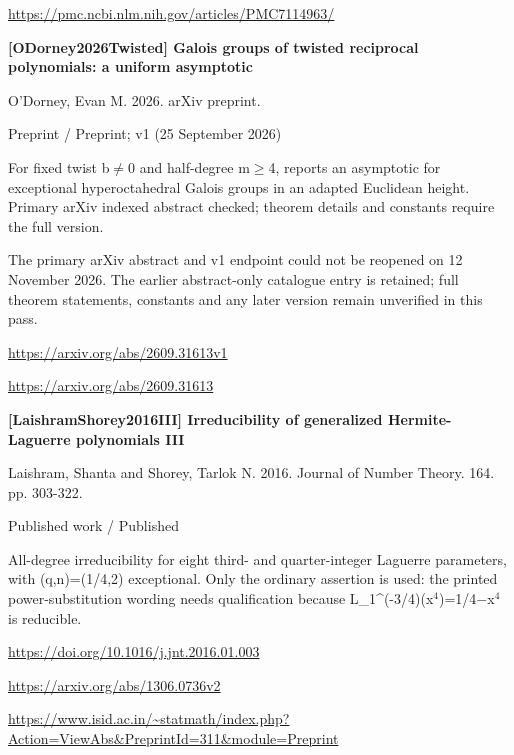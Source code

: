 \documentclass[11pt,a4paper,oneside,openany]{book}
\begin{document}
{\footnotesize\url{https://pmc.ncbi.nlm.nih.gov/articles/PMC7114963/}}\par
\vspace{9pt}
\hypertarget{ref:ODorney2026Twisted}{}
{\sffamily\bfseries\color{atlasgreen}[ODorney2026Twisted] Galois groups of twisted reciprocal polynomials: a uniform asymptotic}\par
\color{black} O'Dorney, Evan M. 2026. arXiv preprint.\par
{\small\sffamily\color{atlasgold}Preprint / Preprint; v1 (25 September 2026)}\par
\color{black} For fixed twist b\ensuremath{\ne}0 and half-degree m\ensuremath{\ge}4, reports an asymptotic for exceptional hyperoctahedral Galois groups in an adapted Euclidean height. Primary arXiv indexed abstract checked; theorem details and constants require the full version.\par
{\small The primary arXiv abstract and v1 endpoint could not be reopened on 12 November 2026. The earlier abstract-only catalogue entry is retained; full theorem statements, constants and any later version remain unverified in this pass.}\par
{\footnotesize\url{https://arxiv.org/abs/2609.31613v1}}\par
{\footnotesize\url{https://arxiv.org/abs/2609.31613}}\par
\vspace{9pt}
\hypertarget{ref:LaishramShorey2016III}{}
{\sffamily\bfseries\color{atlasgreen}[LaishramShorey2016III] Irreducibility of generalized Hermite-Laguerre polynomials III}\par
\color{black} Laishram, Shanta and Shorey, Tarlok N. 2016. Journal of Number Theory. 164. pp. 303-322.\par
{\small\sffamily\color{atlasgold}Published work / Published}\par
\color{black} All-degree irreducibility for eight third- and quarter-integer Laguerre parameters, with (q,n)=(1/4,2) exceptional. Only the ordinary assertion is used: the printed power-substitution wording needs qualification because L\_\allowbreak{}1\textasciicircum{}(-3/4)(x\ensuremath{{}^4})=1/4\ensuremath{-}x\ensuremath{{}^4} is reducible.\par
{\footnotesize\url{https://doi.org/10.1016/j.jnt.2016.01.003}}\par
{\footnotesize\url{https://arxiv.org/abs/1306.0736v2}}\par
{\footnotesize\url{https://www.isid.ac.in/~statmath/index.php?Action=ViewAbs&PreprintId=311&module=Preprint}}\par
\end{document}
